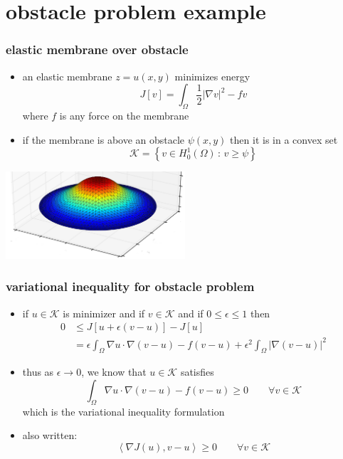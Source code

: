 \documentclass{beamer}
\newcommand{\eps}{\epsilon}
\newcommand{\grad}{\nabla}
\begin{document}
\section[obstacle]{obstacle problem example}

\begin{frame}
  \frametitle{elastic membrane over obstacle}

\begin{itemize}
\item an elastic membrane $z = u(x,y)$ minimizes energy
$$J[v] = \int_\Omega \frac{1}{2} |\grad v|^2 - f v$$
where $f$ is any force on the membrane
\item if the membrane is above an obstacle $\psi(x,y)$ then it is in a convex set
$$\mathcal{K} = \left\{v \in H_0^1(\Omega) \,:\, v \ge \psi\right\}$$
\end{itemize}

\begin{center}
\includegraphics[width=0.5\textwidth]{figs/obs-soln}
\end{center}
\end{frame}


\begin{frame}
  \frametitle{variational inequality for obstacle problem}

\begin{itemize}
\item if $u\in \mathcal{K}$ is minimizer and if $v\in\mathcal{K}$ and if $0\le \eps \le 1$ then
   \begin{align*}
   0 &\le J[u + \eps(v-u)] - J[u] \\
     &= \eps \int_\Omega \grad u \cdot \grad(v-u) - f (v-u) + \eps^2 \int_\Omega |\grad(v-u)|^2
   \end{align*}
\item thus as $\eps \to 0$, we know that $u\in\mathcal{K}$ satisfies
  $$\int_\Omega \grad u \cdot \grad(v-u) - f (v-u) \ge 0 \qquad \forall v\in\mathcal{K}$$
which is the variational inequality formulation
\item also written:
  $$\left<\grad J(u), v-u\right> \ge 0 \qquad \forall v\in\mathcal{K}$$
\end{itemize}
\end{frame}
\end{document}
